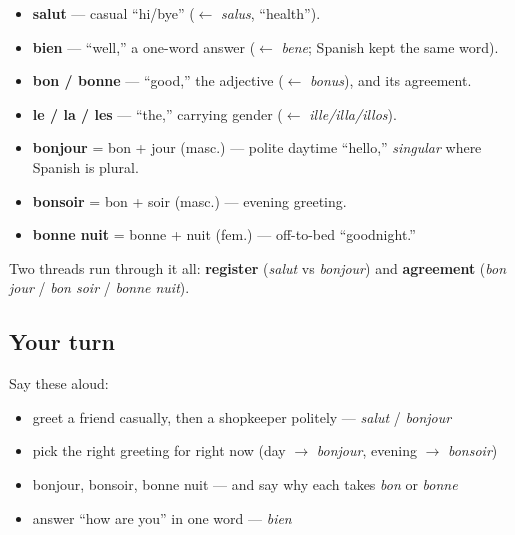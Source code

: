 \begin{grammarlens}[title={What you've built}]
\begin{itemize}
\raggedright
  \item \textbf{salut} — casual \textquotedblleft{}hi/bye\textquotedblright{} ($\leftarrow$ \emph{salus}, \textquotedblleft{}health\textquotedblright{}).
  \item \textbf{bien} — \textquotedblleft{}well,\textquotedblright{} a one-word answer ($\leftarrow$ \emph{bene}; Spanish kept the same word).
  \item \textbf{bon / bonne} — \textquotedblleft{}good,\textquotedblright{} the adjective ($\leftarrow$ \emph{bonus}), and its agreement.
  \item \textbf{le / la / les} — \textquotedblleft{}the,\textquotedblright{} carrying gender ($\leftarrow$ \emph{ille/illa/illos}).
  \item \textbf{bonjour} = bon + jour (masc.) — polite daytime \textquotedblleft{}hello,\textquotedblright{} \emph{singular} where Spanish is plural.
  \item \textbf{bonsoir} = bon + soir (masc.) — evening greeting.
  \item \textbf{bonne nuit} = bonne + nuit (fem.) — off-to-bed \textquotedblleft{}goodnight.\textquotedblright{}
\end{itemize}

Two threads run through it all: \textbf{register} (\emph{salut} vs \emph{bonjour}) and \textbf{agreement} (\emph{bon jour} / \emph{bon soir} / \emph{bonne nuit}).
\end{grammarlens}

\subsection*{Your turn}
Say these aloud:

\begin{itemize}
\raggedright
  \item greet a friend casually, then a shopkeeper politely — \emph{salut} / \emph{bonjour}
  \item pick the right greeting for right now (day $\to$ \emph{bonjour}, evening $\to$ \emph{bonsoir})
  \item bonjour, bonsoir, bonne nuit — and say why each takes \emph{bon} or \emph{bonne}
  \item answer \textquotedblleft{}how are you\textquotedblright{} in one word — \emph{bien}
\end{itemize}


